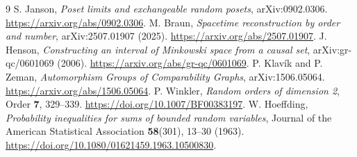 \documentclass[11pt]{article}
\theoremstyle{remark}
\begin{document}
\begin{thebibliography}{9}
 S. Janson, \emph{Poset limits and exchangeable random
posets}, arXiv:0902.0306. \url{https://arxiv.org/abs/0902.0306}.
 M. Braun, \emph{Spacetime reconstruction by order and
number}, arXiv:2507.01907 (2025).
\url{https://arxiv.org/abs/2507.01907}.
 J. Henson, \emph{Constructing an interval of Minkowski
space from a causal set}, arXiv:gr-qc/0601069 (2006).
\url{https://arxiv.org/abs/gr-qc/0601069}.
 P. Klav\'ik and P. Zeman,
\emph{Automorphism Groups of Comparability Graphs},
arXiv:1506.05064. \url{https://arxiv.org/abs/1506.05064}.
 P. Winkler, \emph{Random orders of dimension 2},
Order \textbf{7}, 329--339.
\url{https://doi.org/10.1007/BF00383197}.
 W. Hoeffding, \emph{Probability inequalities for
sums of bounded random variables}, Journal of the American Statistical
Association \textbf{58}(301), 13--30 (1963).
\url{https://doi.org/10.1080/01621459.1963.10500830}.
\end{thebibliography}
\end{document}
